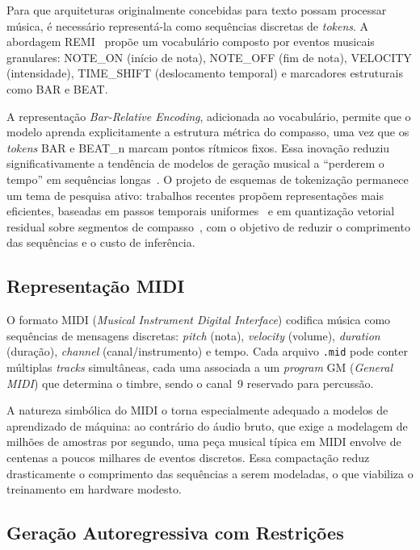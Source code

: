 \documentclass[12pt]{article}
\begin{document}
Para que arquiteturas originalmente concebidas para texto possam processar
música, é necessário representá-la como sequências discretas de \emph{tokens}. A
abordagem REMI~\cite{huang2020} propõe um vocabulário composto por eventos
musicais granulares: NOTE\_ON (início de nota), NOTE\_OFF (fim de nota), VELOCITY
(intensidade), TIME\_SHIFT (deslocamento temporal) e marcadores estruturais como
BAR e BEAT.

A representação \emph{Bar-Relative Encoding}, adicionada ao vocabulário, permite
que o modelo aprenda explicitamente a estrutura métrica do compasso, uma vez que
os \emph{tokens} BAR e BEAT\_n marcam pontos rítmicos fixos. Essa inovação reduziu
significativamente a tendência de modelos de geração musical a ``perderem o
tempo'' em sequências longas~\cite{huang2020}. O projeto de esquemas de
tokenização permanece um tema de pesquisa ativo: trabalhos recentes propõem
representações mais eficientes, baseadas em passos temporais
uniformes~\cite{qian2026} e em quantização vetorial residual sobre segmentos de
compasso~\cite{huang2025}, com o objetivo de reduzir o comprimento das sequências
e o custo de inferência.

\subsection{Representação MIDI}

O formato MIDI (\emph{Musical Instrument Digital Interface}) codifica música como
sequências de mensagens discretas: \emph{pitch} (nota), \emph{velocity} (volume),
\emph{duration} (duração), \emph{channel} (canal/instrumento) e tempo. Cada
arquivo \texttt{.mid} pode conter múltiplas \emph{tracks} simultâneas, cada uma
associada a um \emph{program} GM (\emph{General MIDI}) que determina o timbre,
sendo o canal~9 reservado para percussão.

A natureza simbólica do MIDI o torna especialmente adequado a modelos de
aprendizado de máquina: ao contrário do áudio bruto, que exige a modelagem de
milhões de amostras por segundo, uma peça musical típica em MIDI envolve de
centenas a poucos milhares de eventos discretos. Essa compactação reduz
drasticamente o comprimento das sequências a serem modeladas, o que viabiliza o
treinamento em hardware modesto.

\subsection{Geração Autoregressiva com Restrições}
\end{document}
